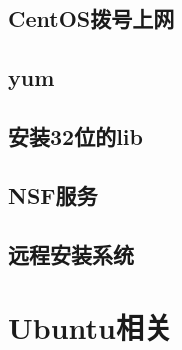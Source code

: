  
 
 
\section{CentOS拨号上网}

\section{yum}


\section{安装32位的lib}

\section{NSF服务}

\section{远程安装系统}


\chapter{Ubuntu相关}










